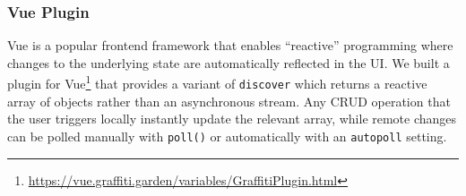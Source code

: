 








\subsubsection{Vue Plugin}

Vue is a popular frontend framework that enables ``reactive'' programming where
changes to the underlying state are automatically reflected in the UI.
We built a plugin for Vue\footnote{
  \url{https://vue.graffiti.garden/variables/GraffitiPlugin.html}
}
that provides a variant of
\texttt{discover} which returns a reactive array of objects rather than
an asynchronous stream.
Any CRUD operation that the user triggers locally instantly update
the relevant array, while remote changes can be polled manually
with \texttt{poll()} or automatically
with an \texttt{autopoll} setting.

